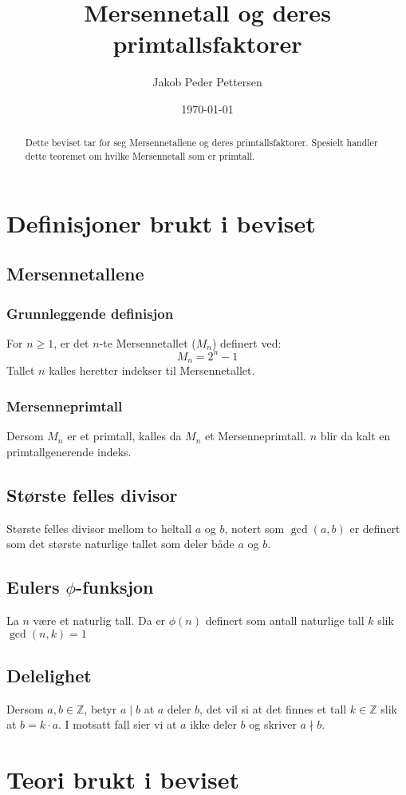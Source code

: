 \documentclass[a4paper,twoside]{article}
\title{Mersennetall og deres primtallsfaktorer}
\author{Jakob Peder Pettersen}
\date{\today}
\theoremstyle{plain}
\newcommand{\setZ}{\mathbb{Z}}
\begin{document}
\maketitle
\begin{abstract}
Dette beviset tar for seg Mersennetallene og deres primtallsfaktorer. Spesielt handler dette teoremet om hvilke Mersennetall som er primtall.
\end{abstract}
\tableofcontents \newpage
\section{Definisjoner brukt i beviset}
\subsection{Mersennetallene}
\subsubsection{Grunnleggende definisjon}
For $n\geq 1$, er det $n$-te Mersennetallet ($M_n$) definert ved:
\[
M_n=2^{n}-1
\]
Tallet $n$ kalles heretter indekser til Mersennetallet.
\subsubsection{Mersenneprimtall}
Dersom $M_n$ er et primtall, kalles da $M_n$ et Mersenneprimtall. $n$ blir da kalt en primtallgenerende indeks.
\subsection{Største felles divisor}
Største felles divisor mellom to heltall $a$ og $b$, notert som $\gcd\left(a,b\right)$ er definert som det største naturlige tallet som deler både $a$ og $b$.
\subsection{Eulers $\phi$-funksjon}
La $n$ være et naturlig tall. Da er $\phi(n)$ definert som antall naturlige tall $k$ slik $\gcd(n,k)=1$
\subsection{Delelighet}
Dersom $a,b \in \setZ$, betyr $a \mid b$ at $a$ deler $b$, det vil si at det finnes et tall $k\in \setZ$ slik at $b=k\cdot a$. I motsatt fall sier vi at $a$ ikke deler $b$ og skriver $a\nmid b$.
\section{Teori brukt i beviset}
\end{document}

